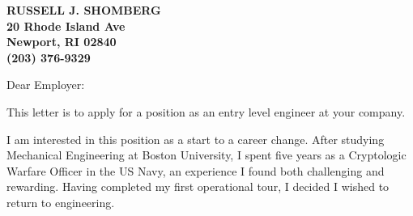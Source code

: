 \documentclass[11pt]{letter} %
\begin{document}
\signature{Russell Shomberg}                  %
\longindentation=0pt                       %
\let\raggedleft\raggedright                %
 
\begin{letter}

\begin{center}
\large\bf RUSSELL J. SHOMBERG \\
20 Rhode Island Ave \\ Newport, RI 02840 \\ (203) 376-9329
\end{center} 
\vfill %


 
\opening{Dear Employer:} 
 

\noindent This letter is to apply for a position as an entry level engineer at your company.
 

\noindent I am interested in this position as a start to a career change. After studying Mechanical Engineering at Boston University, I spent five years as a Cryptologic Warfare Officer in the US Navy, an experience I found both challenging and rewarding. Having completed my first operational tour, I decided I wished to return to engineering.


\end{letter}
\end{document}
